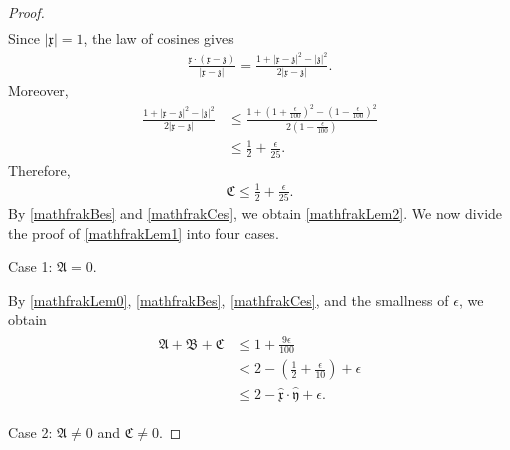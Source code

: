 \documentclass[reqno]{amsart}
\theoremstyle{plain}
\theoremstyle{definition}
\numberwithin{equation}{section}
\begin{document}
\begin{proof}
\begin{align*}
\end{align*}
Since $|\mathfrak{x}|=1$, the law of cosines gives
\begin{align*}
\frac{\mathfrak{x}\cdot(\mathfrak{x}-\mathfrak{z})}
{|\mathfrak{x}-\mathfrak{z}|}
=
\frac{1+|\mathfrak{x}-\mathfrak{z}|^2-|\mathfrak{z}|^2}
{2|\mathfrak{x}-\mathfrak{z}|}.
\end{align*}
Moreover,
\begin{align*}
\frac{1+|\mathfrak{x}-\mathfrak{z}|^2-|\mathfrak{z}|^2}
{2|\mathfrak{x}-\mathfrak{z}|}
&\leq
\frac{1+\left(1+\frac{\epsilon}{100}\right)^2
-\left(1-\frac{\epsilon}{100}\right)^2}
{2\left(1-\frac{\epsilon}{100}\right)}
\\
&\leq
\frac{1}{2}+\frac{\epsilon}{25}.
\end{align*}
Therefore,
\begin{align}\label{mathfrakCes}
\mathfrak{C}\leq \frac{1}{2}+\frac{\epsilon}{25}.
\end{align}
By \eqref{mathfrakBes} and \eqref{mathfrakCes}, we obtain \eqref{mathfrakLem2}. We now divide the proof of \eqref{mathfrakLem1} into four cases.

Case 1: $\mathfrak{A}=0$.

By \eqref{mathfrakLem0}, \eqref{mathfrakBes}, \eqref{mathfrakCes}, and the smallness of $\epsilon$, we obtain
\begin{align}\label{mathfrakCase1}
\begin{aligned}
\mathfrak{A}+\mathfrak{B}+\mathfrak{C}&\leq 1+\frac{9\epsilon}{100}
\\
&< 2-\left(\frac{1}{2}+\frac{\epsilon}{10}\right)+\epsilon
\\
&\leq 2-\hat{\mathfrak{x}}\cdot \hat{\mathfrak{y}}+\epsilon.
\end{aligned}
\end{align}

Case 2: $\mathfrak{A}\neq 0$ and $\mathfrak{C}\neq 0$.


\end{proof}
\end{document}
